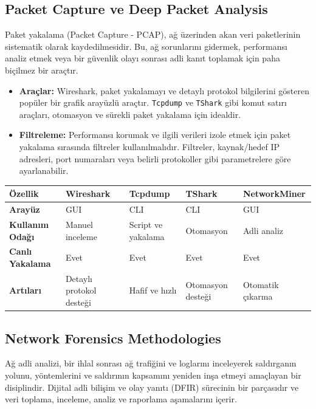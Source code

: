 \subsection{Packet Capture ve Deep Packet Analysis}

Paket yakalama (Packet Capture - PCAP), ağ üzerinden akan veri paketlerinin sistematik olarak kaydedilmesidir. Bu, ağ sorunlarını gidermek, performansı analiz etmek veya bir güvenlik olayı sonrası adli kanıt toplamak için paha biçilmez bir araçtır.

\begin{itemize}
\item \textbf{Araçlar:} Wireshark, paket yakalamayı ve detaylı protokol bilgilerini gösteren popüler bir grafik arayüzlü araçtır. \texttt{Tcpdump} ve \texttt{TShark} gibi komut satırı araçları, otomasyon ve sürekli paket yakalama için idealdir.
\item \textbf{Filtreleme:} Performansı korumak ve ilgili verileri izole etmek için paket yakalama sırasında filtreler kullanılmalıdır. Filtreler, kaynak/hedef IP adresleri, port numaraları veya belirli protokoller gibi parametrelere göre ayarlanabilir.
\end{itemize}


\begin{adjustbox}{max width=\textwidth}
\begin{tabularx}{\textwidth}{|l|X|X|X|X|}
\hline
\textbf{Özellik} & \textbf{Wireshark} & \textbf{Tcpdump} & \textbf{TShark} & \textbf{NetworkMiner} \\
\hline
\textbf{Arayüz} & GUI & CLI & CLI & GUI \\
\hline
\textbf{Kullanım Odağı} & Manuel inceleme & Script ve yakalama & Otomasyon & Adli analiz \\
\hline
\textbf{Canlı Yakalama} & Evet & Evet & Evet & Evet \\
\hline
\textbf{Artıları} & Detaylı protokol desteği & Hafif ve hızlı & Otomasyon desteği & Otomatik çıkarma \\
\hline
\end{tabularx}
\end{adjustbox}



\subsection{Network Forensics Methodologies}

Ağ adli analizi, bir ihlal sonrası ağ trafiğini ve loglarını inceleyerek saldırganın yolunu, yöntemlerini ve saldırının kapsamını yeniden inşa etmeyi amaçlayan bir disiplindir. Dijital adli bilişim ve olay yanıtı (DFIR) sürecinin bir parçasıdır ve veri toplama, inceleme, analiz ve raporlama aşamalarını içerir.

